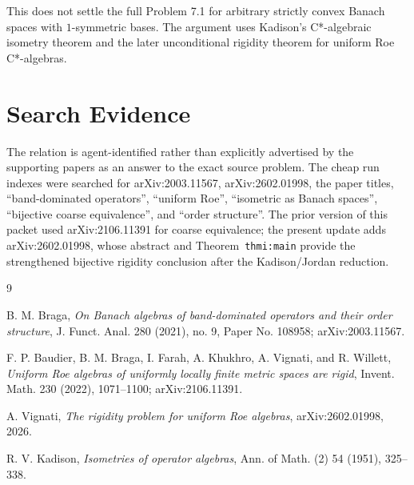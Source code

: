 \documentclass[11pt]{article}
\begin{document}
This does not settle the full Problem 7.1 for arbitrary strictly convex Banach spaces with $1$-symmetric bases.  The argument uses Kadison's C*-algebraic isometry theorem and the later unconditional rigidity theorem for uniform Roe C*-algebras.

\section*{Search Evidence}

The relation is agent-identified rather than explicitly advertised by the supporting papers as an answer to the exact source problem.  The cheap run indexes were searched for arXiv:2003.11567, arXiv:2602.01998, the paper titles, ``band-dominated operators'', ``uniform Roe'', ``isometric as Banach spaces'', ``bijective coarse equivalence'', and ``order structure''.  The prior version of this packet used arXiv:2106.11391 for coarse equivalence; the present update adds arXiv:2602.01998, whose abstract and Theorem~\texttt{thmi:main} provide the strengthened bijective rigidity conclusion after the Kadison/Jordan reduction.

\begin{thebibliography}{9}

B. M. Braga,
\emph{On Banach algebras of band-dominated operators and their order structure},
J. Funct. Anal. 280 (2021), no. 9, Paper No. 108958; arXiv:2003.11567.

F. P. Baudier, B. M. Braga, I. Farah, A. Khukhro, A. Vignati, and R. Willett,
\emph{Uniform Roe algebras of uniformly locally finite metric spaces are rigid},
Invent. Math. 230 (2022), 1071--1100; arXiv:2106.11391.

A. Vignati,
\emph{The rigidity problem for uniform Roe algebras},
arXiv:2602.01998, 2026.

R. V. Kadison,
\emph{Isometries of operator algebras},
Ann. of Math. (2) 54 (1951), 325--338.

\end{thebibliography}
\end{document}
